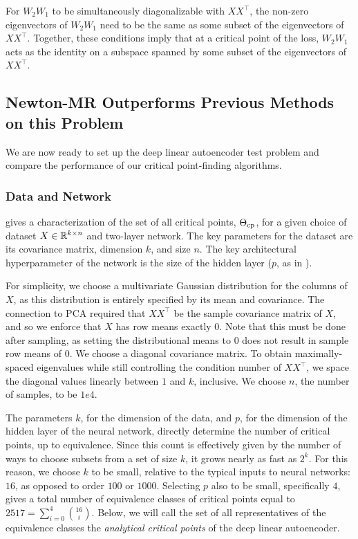 \documentclass[../../thesis.tex]{subfiles}
\begin{document}
For $W_2 W_1$ to be simultaneously diagonalizable with $XX^\top$,
the non-zero eigenvectors of $W_2W_1$
need to be the same as some subset of the eigenvectors of $XX^\top$.
Together, these conditions imply that
at a critical point of the loss,
$W_2W_1$ acts as the identity
on a subspace spanned by some subset of the eigenvectors of $XX^\top$.

\subsection{Newton-MR Outperforms Previous Methods on this Problem}%

We are now ready to set up the deep linear autoencoder
test problem and compare the performance of our
critical point-finding algorithms.

\subsubsection{Data and Network}

 gives a characterization
of the set of all critical points, $\Theta_{\mathrm{cp}}$,
for a given choice of dataset $X\in\mathbb{R}^{k \times n}$ and two-layer network.
The key parameters for the dataset are its covariance matrix,
dimension $k$, and size $n$.
The key architectural hyperparameter of the network is the
size of the hidden layer
($p$, as in ).

For simplicity, we choose a multivariate Gaussian distribution
for the columns of $X$,
as this distribution is entirely specified by its mean and covariance.
The connection to PCA
required that $XX^\top$ be the sample covariance matrix of $X$,
and so we enforce that $X$ has row means exactly $0$.
Note that this must be done after sampling,
as setting the distributional means to $0$ does not
result in sample row means of $0$.
We choose a diagonal covariance matrix.
To obtain maximally-spaced eigenvalues while still
controlling the condition number of $XX^\top$,
we space the diagonal values linearly between $1$ and $k$,
inclusive.
We choose $n$, the number of samples, to be $1e4$.

The parameters $k$, for the dimension of the data,
and $p$, for the dimension of the hidden layer of the neural network,
directly determine the number of critical points,
up to equivalence.
Since this count is effectively
given by the number of ways to choose subsets from a set of size $k$,
it grows nearly as fast as $2^k$.
For this reason, we choose $k$ to be small, relative to the typical
inputs to neural networks: $16$, as opposed to order $100$ or $1000$.
Selecting $p$ also to be small, specifically $4$,
gives a total number of equivalence classes of critical points equal to
$2517 = \sum_{i=0}^4 \binom{16}{i}$.
Below, we will call the set of all representatives of the
equivalence classes the \emph{analytical critical points}
of the deep linear autoencoder.
\end{document}
